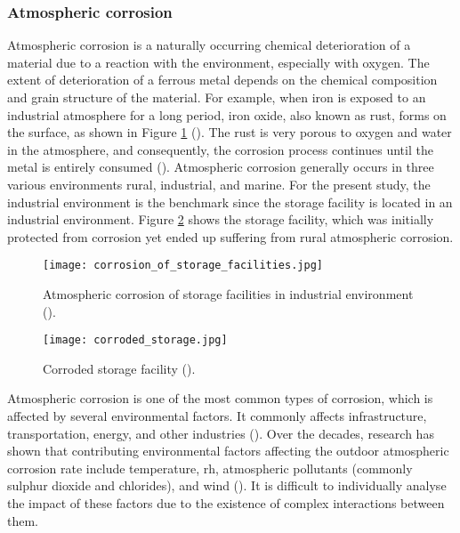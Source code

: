 \subsubsection{Atmospheric corrosion}
Atmospheric corrosion is a naturally occurring chemical deterioration of a material due to a reaction with the environment, especially with oxygen. The extent of deterioration of a ferrous metal depends on the chemical composition and grain structure of the material. For example, when iron is exposed to an industrial atmosphere for a long period, iron oxide, also known as rust, forms on the surface, as shown in Figure \ref{ch3:figure:corrosion} (\cite{mcarthur2004engineering}). The rust is very porous to oxygen and water in the atmosphere, and consequently, the corrosion process continues until the metal is entirely consumed (\cite{protopopoff2011surface}).  Atmospheric corrosion generally occurs in three various environments rural, industrial, and marine. For the present study, the industrial environment is the benchmark since the storage facility is located in an industrial environment. Figure \ref{ch3:figure:corroded} shows the storage facility, which was initially protected from corrosion yet ended up suffering from rural atmospheric corrosion.

\begin{figure}[H]
    \centering
    \texttt{[image: corrosion\_of\_storage\_facilities.jpg]}
    \caption{Atmospheric corrosion of storage facilities in industrial environment (\cite{chigondo2016recent}).}
    \label{ch3:figure:corrosion}
\end{figure}
 
\begin{figure}[H]
    \centering
    \texttt{[image: corroded\_storage.jpg]}
    \caption{Corroded storage facility (\cite{protopopoff2011surface}).}
    \label{ch3:figure:corroded}
\end{figure}

Atmospheric corrosion is one of the most common types of corrosion, which is affected by several environmental factors. It commonly affects infrastructure, transportation, energy, and other industries (\cite{pei2021understanding}). Over the decades, research has shown that contributing environmental factors affecting the outdoor atmospheric corrosion rate include temperature, \acrfull{rh}, atmospheric pollutants (commonly sulphur dioxide and chlorides), and wind (\cite{abou2001mechanical, islam2018effects}). It is difficult to individually analyse the impact of these factors due to the existence of complex interactions between them.

